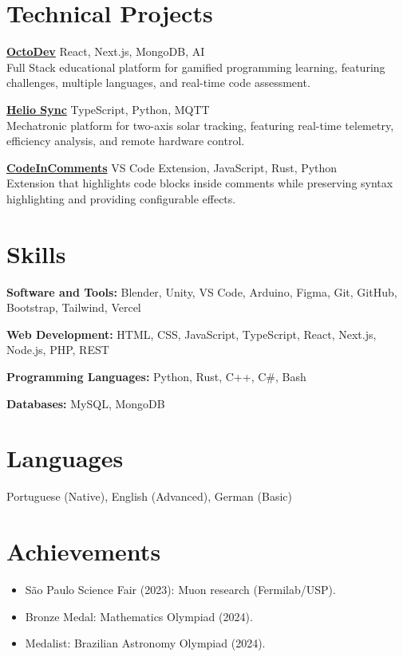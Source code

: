 \documentclass[10pt,a4paper]{article}
\begin{document}
\section*{Technical Projects}
\textbf{\href{https://octodev.vercel.app/}{OctoDev}} \textbar{} React, Next.js, MongoDB, AI\\
Full Stack educational platform for gamified programming learning, featuring challenges, multiple languages, and real-time code assessment.

\textbf{\href{https://helio-sync.vercel.app}{Helio Sync}} \textbar{} TypeScript, Python, MQTT\\
Mechatronic platform for two-axis solar tracking, featuring real-time telemetry, efficiency analysis, and remote hardware control.

\textbf{\href{https://github.com/renanrod4/vscode-code-in-comments}{CodeInComments}} \textbar{} VS Code Extension, JavaScript, Rust, Python\\
Extension that highlights code blocks inside comments while preserving syntax highlighting and providing configurable effects.

\section*{Skills}
\textbf{Software and Tools:} Blender, Unity, VS Code, Arduino, Figma, Git, GitHub,\\
Bootstrap, Tailwind, Vercel

\textbf{Web Development:} HTML, CSS, JavaScript, TypeScript, React, Next.js, Node.js, PHP, REST

\textbf{Programming Languages:} Python, Rust, C++, C\#, Bash

\textbf{Databases:} MySQL, MongoDB

\section*{Languages}
Portuguese (Native), English (Advanced), German (Basic)

\section*{Achievements}
\begin{itemize}
  \item São Paulo Science Fair (2023): Muon research (Fermilab/USP).
  \item Bronze Medal: Mathematics Olympiad (2024).
  \item Medalist: Brazilian Astronomy Olympiad (2024).
\end{itemize}
\end{document}
